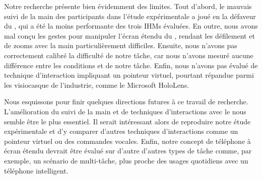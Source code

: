 Notre recherche présente bien évidemment des limites. Tout d'abord, le mauvais suivi de la main des participants dans l'étude expérimentale a joué en la défaveur du , qui a été la moins performante des trois IHMs évaluées. En outre, nous avons mal conçu les gestes pour manipuler l'écran étendu du , rendant les défilement et de zooms avec la main particulièrement difficiles. Ensuite, nous n'avons pas correctement calibré la difficulté de notre tâche, car nous n'avons mesuré aucune différence entre les conditions  et  de notre tâche. Enfin, nous n'avons pas évalué de technique d'interaction impliquant un pointeur virtuel, pourtant répandue parmi les visiocasque de l'industrie, comme le Microsoft HoloLens.

Nous esquissons pour finir quelques directions futures à ce travail de recherche. L'amélioration du suivi de la main et de techniques d'interactions avec le  nous semble être le plus essentiel. Il serait intéressant alors de reproduire notre étude expérimentale et d'y comparer d'autres techniques d'interactions comme un pointeur virtuel ou des commandes vocales. Enfin, notre concept de téléphone à écran étendu devrait être évalué sur d'autre d'autres types de tâche comme, par exemple, un scénario de multi-tâche, plus proche des usages quotidiens avec un téléphone intelligent.
